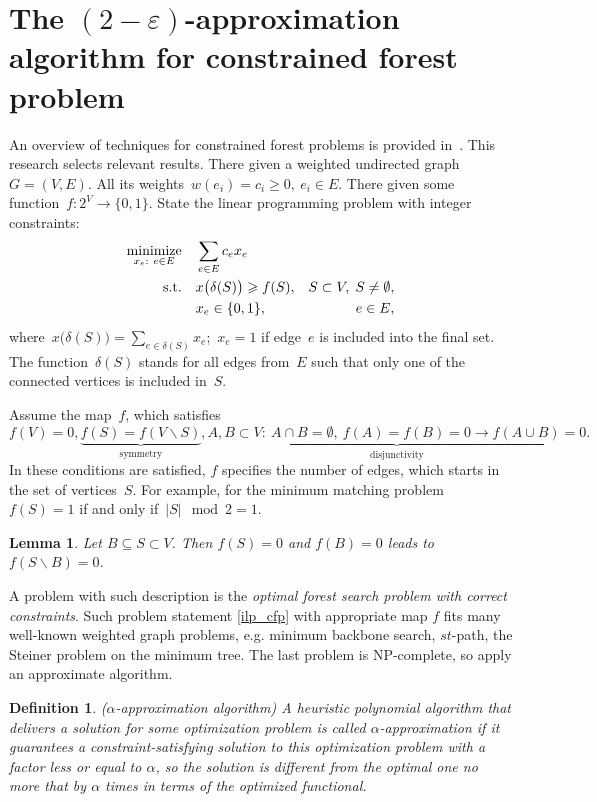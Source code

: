 \documentclass[12pt]{article}
\newtheorem{definition}{Definition}
\newtheorem{lemma}{Lemma}
\begin{document}
\section{The $(2-\varepsilon)$-approximation algorithm for constrained forest problem}


An overview of techniques for constrained forest problems is provided in~\cite{goemans1995general}. This research selects relevant  results. There given a weighted undirected graph~$G=(V,E)$. All its weights~$w(e_i)=c_i\geqslant 0,~ e_i\in E$. There given some function~$f:2^{V}\to \{0, 1\}$. State the linear programming problem with integer constraints:
\begin{align}
\underset{x_e:~e\in E}{\text{minimize}}\quad & \sum\limits_{e\in E}c_ex_e \nonumber\\
\text{s.t.\quad} & x\bigl(\delta(S)\bigr)\geqslant f(S), & S \subset V, \; S \not= \emptyset,
\label{ilp_cfp}\\
& x_e\in\{0,1\}, & e\in E,\nonumber
\end{align}
where~$x\bigl(\delta(S)\bigr)=\sum\limits_{e\in \delta(S)}x_e$;~$x_e=1$ if edge~$e$ is included into the final set. The function~$\delta(S)$ stands for all edges from~$E$ such that only one of the connected vertices is included in~$S$.


Assume the map~$f$, which satisfies
\[
f(V) = 0, \underbrace{f(S)=f(V\backslash S)}_{\text{symmetry}},
\underbrace{A,B\subset V:~A\cap B = \emptyset,~f(A)=f(B)=0\to f(A\cup B) = 0}_{\text{disjunctivity}}.
\]
In these conditions are satisfied, $f$ specifies the number of edges, which starts in the set of vertices~$S$. For example, for the minimum %
matching problem~$f (S) = 1$ if and only if~\mbox{$|S|\mod 2 = 1$.}


\begin{lemma}
  Let $B\subseteq S\subset V$. Then $f(S) = 0$ and $f(B) = 0$ leads to $f(S\backslash B) = 0$.
  \label{lem1}
\end{lemma}
A problem with such description is the \emph{optimal forest search problem with correct constraints}. Such problem statement \eqref{ilp_cfp} with appropriate map $f$ fits many well-known weighted graph problems, e.g. minimum backbone search, $st$-path, the Steiner problem on the minimum tree. The last problem is NP-complete, so apply an approximate algorithm.


\begin{definition} {($\alpha$-approximation algorithm)}
A heuristic polynomial algorithm that delivers a solution for some optimization problem is called $\alpha$-approximation if it guarantees a constraint-satisfying solution to this optimization problem with a factor less or equal to $\alpha$, so the solution is different from the optimal one no more that by $\alpha$ times in terms of the optimized functional.
\end{definition}
\end{document}
